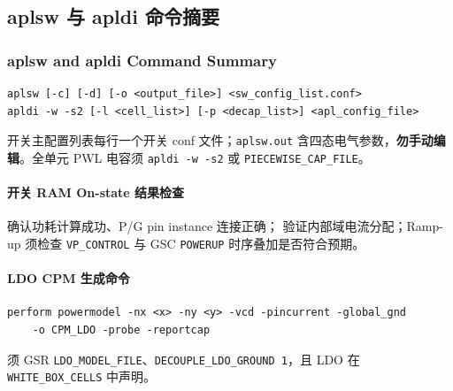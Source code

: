 \subsection{aplsw 与 apldi 命令摘要}
\subsubsection*{aplsw and apldi Command Summary}

\begin{lstlisting}
aplsw [-c] [-d] [-o <output_file>] <sw_config_list.conf>
apldi -w -s2 [-l <cell_list>] [-p <decap_list>] <apl_config_file>
\end{lstlisting}
开关主配置列表每行一个开关 conf 文件；\texttt{aplsw.out} 含四态电气参数，\textbf{勿手动编辑}。全单元 PWL 电容须 \texttt{apldi -w -s2} 或 \texttt{PIECEWISE\_CAP\_FILE}。

\paragraph{开关 RAM On-state 结果检查}
确认功耗计算成功、P/G pin instance 连接正确； 验证内部域电流分配；Ramp-up 须检查 \texttt{VP\_CONTROL} 与 GSC \texttt{POWERUP} 时序叠加是否符合预期。

\paragraph{LDO CPM 生成命令}
\begin{lstlisting}
perform powermodel -nx <x> -ny <y> -vcd -pincurrent -global_gnd
    -o CPM_LDO -probe -reportcap
\end{lstlisting}
须 GSR \texttt{LDO\_MODEL\_FILE}、\texttt{DECOUPLE\_LDO\_GROUND 1}，且 LDO 在 \texttt{WHITE\_BOX\_CELLS} 中声明。

